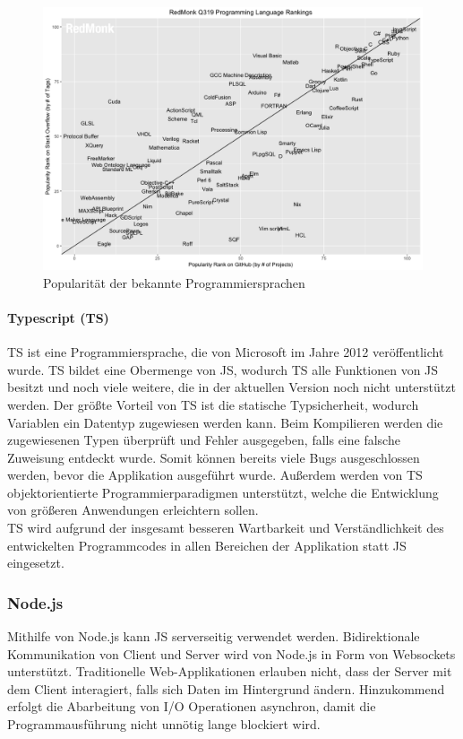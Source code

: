 \begin{figure}[h]
	\includegraphics[width=1\linewidth]{figures/development/technologies/programming_language_rank}
	\caption{Popularität der bekannte Programmiersprachen \cite{grady:language_popularity:2019}}
	\label{fig:github_ranking_programming_language}
\end{figure}

\paragraph{Typescript (TS)} \label{tec:typescript}
\ac{TS} ist eine Programmiersprache, die von Microsoft im Jahre 2012 veröffentlicht wurde. \ac{TS} bildet eine Obermenge von \ac{JS}, wodurch \ac{TS} alle Funktionen von \ac{JS} besitzt und noch viele weitere, die in der aktuellen Version noch nicht unterstützt werden. Der größte Vorteil von \ac{TS} ist die statische Typsicherheit, wodurch Variablen ein Datentyp zugewiesen werden kann. Beim Kompilieren werden die zugewiesenen Typen überprüft und Fehler ausgegeben, falls eine falsche Zuweisung entdeckt wurde. Somit können bereits viele Bugs ausgeschlossen werden, bevor die Applikation ausgeführt wurde. Außerdem werden von \ac{TS} objektorientierte Programmierparadigmen unterstützt, welche die Entwicklung von größeren Anwendungen erleichtern sollen. \cite{lease:typescript:2019} \\
\ac{TS} wird aufgrund der insgesamt besseren Wartbarkeit und Verständlichkeit des entwickelten Programmcodes in allen Bereichen der Applikation statt \acl{JS} eingesetzt.

\subsubsection{Node.js} \label{tec:nodejs}
Mithilfe von Node.js kann \ac{JS} serverseitig verwendet werden. Bidirektionale Kommunikation von Client und Server wird von Node.js in Form von Websockets unterstützt. Traditionelle Web-Applikationen erlauben nicht, dass der Server mit dem Client interagiert, falls sich Daten im Hintergrund ändern. Hinzukommend erfolgt die Abarbeitung von I/O Operationen asynchron, damit die Programmausführung nicht unnötig lange blockiert wird. \cite{nodejs:2013}

